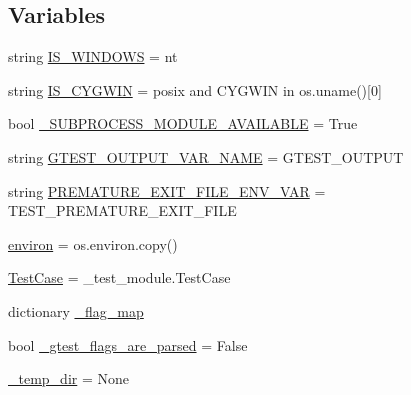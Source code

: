 \subsection*{Variables}
\begin{DoxyCompactItemize}
\item 
string \mbox{\hyperlink{namespacegoogletest_1_1test_1_1gtest__test__utils_a6b3584ff14e7fd8a73463f1beccbe439}{I\+S\+\_\+\+W\+I\+N\+D\+O\+WS}} = \textquotesingle{}nt\textquotesingle{}
\item 
string \mbox{\hyperlink{namespacegoogletest_1_1test_1_1gtest__test__utils_af65a90c167ec83a25495277029e949a9}{I\+S\+\_\+\+C\+Y\+G\+W\+IN}} = \textquotesingle{}posix\textquotesingle{} and \textquotesingle{}C\+Y\+G\+W\+IN\textquotesingle{} in os.\+uname()\mbox{[}0\mbox{]}
\item 
bool \mbox{\hyperlink{namespacegoogletest_1_1test_1_1gtest__test__utils_ae25e29cef5edd0f30c247cc061e98cf8}{\+\_\+\+S\+U\+B\+P\+R\+O\+C\+E\+S\+S\+\_\+\+M\+O\+D\+U\+L\+E\+\_\+\+A\+V\+A\+I\+L\+A\+B\+LE}} = True
\item 
string \mbox{\hyperlink{namespacegoogletest_1_1test_1_1gtest__test__utils_abe97dd3cf6bb1fb54490bf7c9d7ce40f}{G\+T\+E\+S\+T\+\_\+\+O\+U\+T\+P\+U\+T\+\_\+\+V\+A\+R\+\_\+\+N\+A\+ME}} = \textquotesingle{}G\+T\+E\+S\+T\+\_\+\+O\+U\+T\+P\+UT\textquotesingle{}
\item 
string \mbox{\hyperlink{namespacegoogletest_1_1test_1_1gtest__test__utils_ac2f6a398a41a5a183017db8120aee0a2}{P\+R\+E\+M\+A\+T\+U\+R\+E\+\_\+\+E\+X\+I\+T\+\_\+\+F\+I\+L\+E\+\_\+\+E\+N\+V\+\_\+\+V\+AR}} = \textquotesingle{}T\+E\+S\+T\+\_\+\+P\+R\+E\+M\+A\+T\+U\+R\+E\+\_\+\+E\+X\+I\+T\+\_\+\+F\+I\+LE\textquotesingle{}
\item 
\mbox{\hyperlink{namespacegoogletest_1_1test_1_1gtest__test__utils_a3d414b92f5efbce5fb7c075a55ec36d8}{environ}} = os.\+environ.\+copy()
\item 
\mbox{\hyperlink{namespacegoogletest_1_1test_1_1gtest__test__utils_ae9c65c0ce53968419bdc79e62d3adef6}{Test\+Case}} = \+\_\+test\+\_\+module.\+Test\+Case
\item 
dictionary \mbox{\hyperlink{namespacegoogletest_1_1test_1_1gtest__test__utils_a1ac2833d8030351317303334c93a49c1}{\+\_\+flag\+\_\+map}}
\item 
bool \mbox{\hyperlink{namespacegoogletest_1_1test_1_1gtest__test__utils_a1b1c5ce95e4aa3c285b6c508b316ccf6}{\+\_\+gtest\+\_\+flags\+\_\+are\+\_\+parsed}} = False
\item 
\mbox{\hyperlink{namespacegoogletest_1_1test_1_1gtest__test__utils_a9970c82507afb3ea972f45ff989e82a2}{\+\_\+temp\+\_\+dir}} = None
\end{DoxyCompactItemize}


